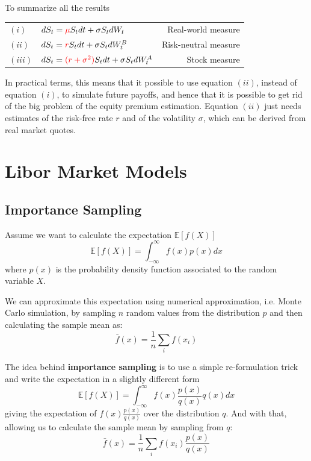 \documentclass[12pt,a4paper]{book}
\begin{document}
\begin{solution}
To summarize all the results

\begin{table}[htbp]
\begin{center}
\begin{tabular}{llr}
$(i)$&$dS_t = \textcolor{red}{\mu} S_t dt + \sigma S_t dW_t$ & Real-world measure \\
$(ii)$&$dS_t = \textcolor{red}{r}S_t dt + \sigma S_t dW_t^B$ & Risk-neutral measure \\
$(iii)$&$dS_t = \textcolor{red}{(r + \sigma^2)}S_t dt + \sigma S_t dW^A_t$ & Stock measure
\end{tabular}
\end{center}
\end{table}
In practical terms, this means that it possible to use equation $(ii)$, instead of equation $(i)$, to simulate future payoffs, and hence that it is possible to get rid of the big problem of the equity premium estimation. Equation $(ii)$ just needs estimates of the risk-free rate $r$ and of the volatility $\sigma$, which can be derived from real market quotes.
\end{solution}

\chapter{Libor Market Models}
\section{Importance Sampling}
Assume we want to calculate the expectation $\mathbb{E}[f(X)]$
\begin{equation}
\mathbb{E}[f(X)] = \int_{-\infty}^\infty f(x)p(x)dx
\end{equation}
where $p(x)$ is the probability density function associated to the random variable $X$.

We can approximate this expectation using numerical approximation, i.e. Monte Carlo simulation, by sampling $n$ random values from the distribution $p$ and then calculating the sample mean as:
\begin{equation}
\bar{f}(x) = \frac{1}{n}\sum_i f(x_i)
\end{equation}

The idea behind \textbf{importance sampling} is to use a simple re-formulation trick and write the expectation in a slightly different form
\begin{equation}
\mathbb{E}[f(X)] = \int_{-\infty}^\infty f(x)\frac{p(x)}{q(x)}q(x)dx
\end{equation}
giving the expectation of $f(x)\frac{p(x)}{q(x)}$ over the distribution $q$. And with that, allowing us to calculate the sample mean by sampling from $q$:
\begin{equation}
\bar{f}(x) = \frac{1}{n}\sum_i f(x_i)\frac{p(x)}{q(x)}
\label{eq:reformulated_expectation}
\end{equation}
\end{document}

